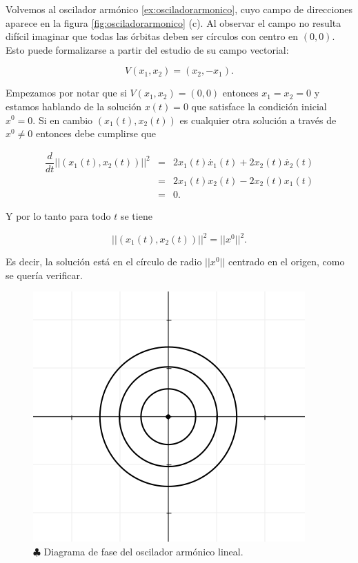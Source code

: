 \begin{example} \label{ej:sistemahiperbolas}
Volvemos al oscilador armónico \ref{ex:osciladorarmonico}, cuyo campo de direcciones aparece en la figura \ref{fig:osciladorarmonico} (c).
Al observar el campo no resulta difícil imaginar que todas las órbitas deben ser círculos con centro en $(0,0)$. Esto puede formalizarse a partir del estudio de su campo vectorial:

$$ V(x_1,x_2) = (x_2, -x_1). $$

Empezamos por notar que si $V(x_1,x_2) = (0,0)$ entonces $x_1 = x_2 = 0$ y estamos hablando de la solución $x(t) = 0$ que satisface la condición inicial $x^0 = 0$. Si en cambio $(x_1(t),x_2(t))$ es cualquier otra solución a través de $x^0 \neq 0$ entonces debe cumplirse que 

$$
\begin{array}{ccl}
	\dfrac{d}{dt} || (x_1(t),x_2(t))  ||^2 & = & 2x_1(t)\dot{x_1}(t) + 2x_2(t)\dot{x_2}(t) \\
									   & = & 2x_1(t)x_2(t) - 2x_2(t)x_1(t) \\
									   & = & 0.
\end{array}
$$

Y por lo tanto para todo $t$ se tiene

$$ ||(x_1(t), x_2(t))||^2 = ||x^0||^2. $$

Es decir, la solución está en el círculo de radio $||x^0||$ centrado en el origen, como se quería verificar.
\end{example}

\begin{figure}[h] \centering
    \includegraphics[scale=0.5]{figures/osciladorarmonico-diagramafase.png}
    \caption{$\clubsuit$ Diagrama de fase del oscilador armónico lineal.}
\end{figure}

